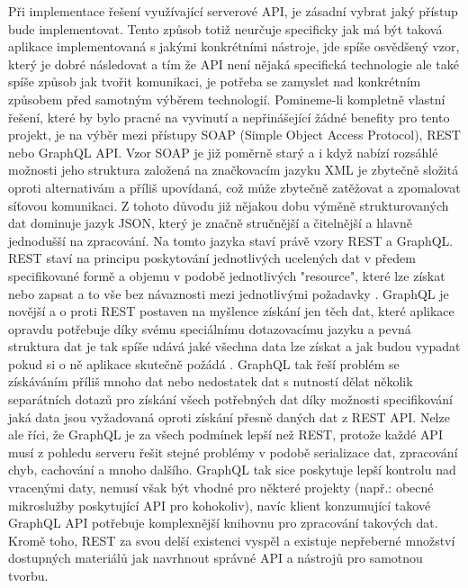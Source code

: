 \begin{itemize}
\begin{itemize}
	Při implementace řešení využívající serverové \ac{API}, je zásadní vybrat jaký přístup bude implementovat.
	Tento způsob totiž neurčuje specificky jak má být taková aplikace implementovaná s jakými konkrétními nástroje, jde
	spíše osvědšený vzor, který je dobré následovat a tím že \ac{API} není nějaká specifická technologie ale také spíše
	způsob jak tvořit komunikaci, je potřeba se zamyslet nad konkrétním způsobem před samotným výběrem technologií.
	Pomineme-li kompletně vlastní řešení, které by bylo pracné na vyvinutí a nepřinášející žádné benefity pro tento projekt,
	je na výběr mezi přístupy \ac{SOAP} (Simple Object Access Protocol), \ac{REST} nebo GraphQL \ac{API}.
	Vzor \ac{SOAP} je již poměrně starý a i když nabízí rozsáhlé možnosti jeho struktura založená na značkovacím jazyku
	\ac{XML} je zbytečně složitá oproti alternativám a příliš upovídaná, což může zbytečně zatěžovat a zpomalovat
	síťovou komunikaci.
	Z tohoto důvodu již nějakou dobu výměně strukturovaných dat dominuje jazyk \ac{JSON}, který je značně stručnější a
	čitelnější a hlavně jednodušší na zpracování.
	Na tomto jazyka staví právě vzory \ac{REST} a \ac{GraphQL}.
	\ac{REST} staví na principu poskytování jednotlivých ucelených dat v předem specifikované formě a objemu v
	podobě jednotlivých "resource", které lze získat nebo zapsat a to vše bez návaznosti mezi jednotlivými požadavky
	\cite{restfulapi}.
	GraphQL je novější a o proti \ac{REST} postaven na myšlence získání jen těch dat, které aplikace opravdu potřebuje díky svému
	speciálnímu dotazovacímu jazyku a pevná struktura dat je tak spíše udává jaké všechna data lze získat a jak budou vypadat
	pokud si o ně aplikace skutečně požádá \cite{graphql}.
	GraphQL tak řeší problém se získáváním příliš mnoho dat nebo nedostatek dat s nutností dělat několik separátních dotazů
	pro získání všech potřebných dat díky možnosti specifikování jaká data jsou vyžadovaná oproti získání
	přesně daných dat z \ac{REST} \ac{API}.
	Nelze ale říci, že GraphQL je za všech podmínek lepší než \ac{REST}, protože každé \ac{API} musí z pohledu serveru
	řešit stejné problémy v podobě serializace dat, zpracování chyb, cachování a mnoho dalšího.
	GraphQL tak sice poskytuje lepší kontrolu nad vracenými daty, nemusí však být vhodné pro některé projekty (např.:
	obecné mikroslužby poskytující \ac{API} pro kohokoliv), navíc klient konzumující takové GraphQL \ac{API} potřebuje
	komplexnější knihovnu pro zpracování takových dat.
	Kromě toho, \ac{REST} za svou delší existenci vyspěl a existuje nepřeberné množství dostupných materiálů jak navrhnout
	správné \ac{API} a nástrojů pro samotnou tvorbu.


\end{itemize}
\end{itemize}
